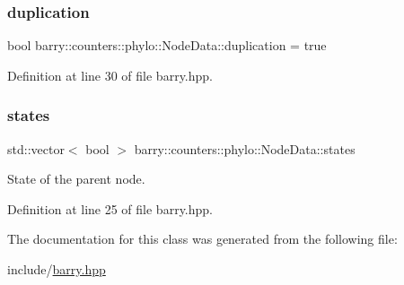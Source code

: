 \subsubsection{\texorpdfstring{duplication}{duplication}}
{\footnotesize\ttfamily bool barry\+::counters\+::phylo\+::\+Node\+Data\+::duplication = true}



Definition at line 30 of file barry.\+hpp.

\mbox{\label{classbarry_1_1counters_1_1phylo_1_1_node_data_a9a88332b03b6c78f386a1fafac660052}} 
\subsubsection{\texorpdfstring{states}{states}}
{\footnotesize\ttfamily std\+::vector$<$ bool $>$ barry\+::counters\+::phylo\+::\+Node\+Data\+::states}

State of the parent node. 

Definition at line 25 of file barry.\+hpp.



The documentation for this class was generated from the following file\+:\begin{DoxyCompactItemize}
\item 
include/\hyperlink{barry_8hpp}{barry.\+hpp}\end{DoxyCompactItemize}
